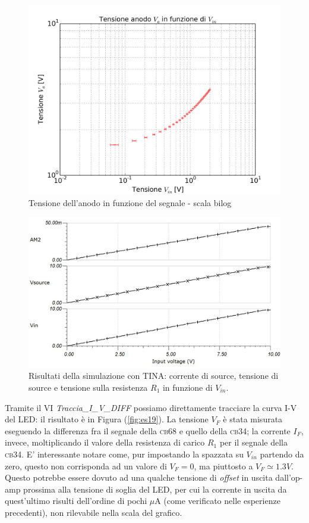 \documentclass[journal, a4paper]{IEEEtran}
\begin{document}
\begin{figure}
\centering
\includegraphics[width=0.9\linewidth]{./es18_0-2_prova1}
\caption{Tensione dell'anodo in funzione del segnale - scala bilog}
\label{fig:es18_0-2_prova1}
\end{figure}

\begin{figure}
\centering
\includegraphics[width=0.8\linewidth]{./es_12_newmosfet_led_graph}
\caption{Risultati della simulazione con TINA: corrente di source, tensione di source e tensione sulla resistenza $R_1$ in funzione di $V_{in}$.}
\label{fig:es_12_newmosfet_led_graph}
\end{figure}


Tramite il VI \textit{Traccia\_I\_V\_DIFF} possiamo direttamente tracciare la curva I-V del LED: il risultato è in Figura (\ref{fig:es19}). La tensione $V_F$ è stata misurata eseguendo la differenza fra il segnale della \textsc{cb68} e quello della \textsc{cb34}; la corrente $I_F$, invece, moltiplicando il valore della resistenza di carico $R_1$ per il segnale della \textsc{cb34}. E' interessante notare come, pur impostando la spazzata su $V_{in}$ partendo da zero, questo non corrisponda ad un valore di $V_F = 0$, ma piuttosto a $V_F \simeq 1.3 V$. Questo potrebbe essere dovuto ad una qualche tensione di \textit{offset} in uscita dall'op-amp prossima alla tensione di soglia del LED, per cui la corrente in uscita da quest'ultimo risulti dell'ordine di pochi $\mu$A (come verificato nelle esperienze precedenti), non rilevabile nella scala del grafico.
\end{document}

